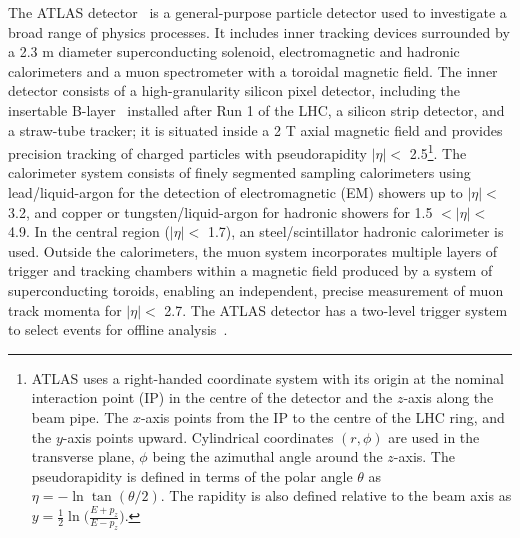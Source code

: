 
The ATLAS detector~\cite{ref:AtlasDet} is a general-purpose particle detector used to investigate 
a broad range of physics processes. It includes inner tracking devices surrounded by a 2.3 m diameter superconducting 
solenoid, electromagnetic and hadronic calorimeters and a muon spectrometer with a toroidal magnetic field. 
The inner detector consists of a high-granularity silicon pixel detector, including the insertable 
B-layer~\cite{ref:IBL} installed after Run 1 of the LHC, a silicon strip detector, and a straw-tube tracker; 
it is situated inside a 2 T axial magnetic field and provides precision tracking of charged particles with 
pseudorapidity $|\eta| <$ 2.5\footnote{ATLAS uses a right-handed coordinate system with its origin 
at the nominal interaction 
point (IP) in the centre of the detector and the $z$-axis along the beam pipe. The $x$-axis points 
from the IP to the centre of the LHC ring, and the $y$-axis points upward. Cylindrical coordinates 
$(r,\phi)$ are used in the transverse plane, $\phi$ being the azimuthal angle around the $z$-axis. 
The pseudorapidity is defined in terms of the polar angle $\theta$ as $\eta=-\ln\tan(\theta/2)$. 
The rapidity is also defined relative to the beam axis as $y = \frac{1}{2}\ln \Big( \frac{E + p_z}{E - p_z} \Big) $. }. 
The calorimeter system consists 
of finely segmented sampling calorimeters using lead/liquid-argon for the 
detection of electromagnetic (EM)
showers up to $|\eta| <$ 3.2, and copper or tungsten/liquid-argon for 
hadronic showers for 1.5 $< |\eta| <$ 4.9.  In the central 
region ($|\eta| <$ 1.7), an steel/scintillator hadronic calorimeter is used.
Outside the calorimeters, the muon system incorporates multiple layers of
trigger and tracking chambers within a magnetic field produced by a system of superconducting toroids,
enabling an independent, precise measurement of muon track momenta for $|\eta| <$ 2.7.
The ATLAS detector has a two-level 
trigger system to select events for offline analysis~\cite{ATL-DAQ-PUB-2016-001}.
